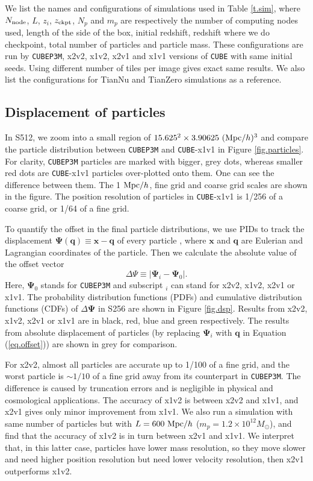 \documentclass[10pt,twocolumn,preprint]{emulateapj}
\newcommand{\bs}{\boldsymbol}
\newcommand{\Msun}{M_\odot}
\begin{document}
We list the names and configurations of simulations used in Table \ref{t.sim}, where $N_{\rm node}$, $L$, $z_i$, $z_{\rm ckpt}$, $N_p$ and $m_p$ are respectively the number of computing nodes used, length of the side of the box, initial redshift, redshift where we do checkpoint, total number of particles and particle mass. These configurations are run by {\tt CUBEP3M}, x2v2, x1v2, x2v1 and x1v1 versions of {\tt CUBE} with same initial seeds. Using different number of tiles per image gives exact same results. We also list the configurations for TianNu and TianZero \citep{2017NatAs...1E.143Y,2017RAA....17...85E} simulations as a reference.

\subsection{Displacement of particles}
In S512, we zoom into a small region of $15.625^2\times 3.90625\ ({\rm Mpc}/h)^3$ and compare the particle distribution between {\tt CUBEP3M} and {\tt CUBE}-x1v1 in Figure \ref{fig.particles}. For clarity, {\tt CUBEP3M} particles are marked with bigger, grey dots, whereas smaller red dots are {\tt CUBE}-x1v1 particles over-plotted onto them. One can see the difference between them. The 1 ${\rm Mpc}/h$, fine grid and coarse grid scales are shown in the figure. The position resolution of particles in {\tt CUBE}-x1v1 is 1/256 of a coarse grid, or 1/64 of a fine grid.

To quantify the offset in the final particle distributions, we use PIDs to track the displacement ${\bs \Psi}({\bs q})\equiv{\bs x}-{\bs q}$ of every particle \citep{2017PhRvD..95d3501Y}, where ${\bs x}$ and ${\bs q}$ are Eulerian and Lagrangian coordinates of the particle. Then we calculate the absolute value of the offset vector
\begin{equation}\label{eq.offset}
	\Delta\Psi\equiv|{\bs\Psi}_i-{\bs\Psi}_0|.
\end{equation}
Here, ${\bs\Psi}_0$ stands for {\tt CUBEP3M} and subscript $_i$ can stand for x2v2, x1v2, x2v1 or x1v1. The probability distribution functions (PDFs) and cumulative distribution functions (CDFs) of $\Delta\bs\Psi$ in S256 are shown in Figure \ref{fig.dsp}. Results from x2v2, x1v2, x2v1 or x1v1 are in black, red, blue and green respectively. The results from absolute displacement of particles (by replacing ${\bs\Psi}_i$ with ${\bs q}$ in Equation (\ref{eq.offset})) are shown in grey for comparison.

For x2v2, almost all particles are accurate up to 1/100 of a fine grid, and the worst particle is $\sim 1/10$ of a fine grid away from its counterpart in {\tt CUBEP3M}. The difference is caused by truncation errors and is negligible in physical and cosmological applications. The accuracy of x1v2 is between x2v2 and x1v1, and x2v1 gives only minor improvement from x1v1. We also run a simulation with same number of particles but with $L=600\ {\rm Mpc}/h$ ($m_p=1.2\times 10^{12}\Msun$), and find that the accuracy of x1v2 is in turn between x2v1 and x1v1. We interpret that, in this latter case, particles have lower mass resolution, so they move slower and need higher position resolution but need lower velocity resolution, then x2v1 outperforms x1v2.
\end{document}
